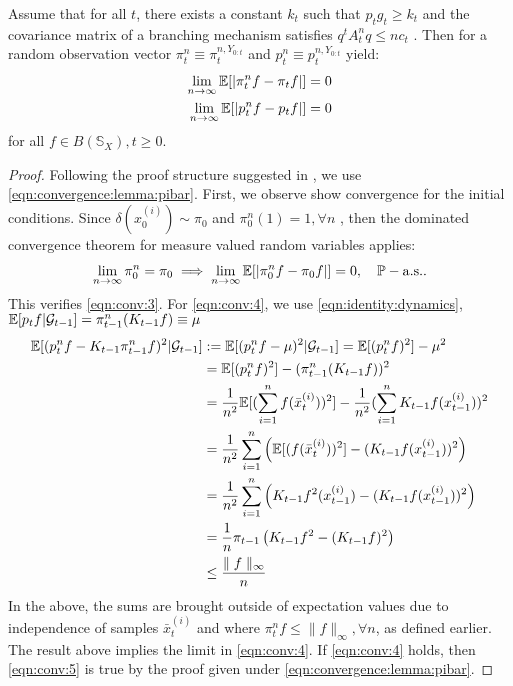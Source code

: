 \begin{theorem}  \label{bain:pfconvergence}
	Assume that for all $t$, there exists a constant $k_t$ such that $p_tg_t \geq k_t$ and the covariance matrix of a branching mechanism satisfies $q^t A_t^n q \leq n c_t$ . Then for a random observation vector $\pi_t^n \equiv \pi_t^{n, Y_{0:t}}$ and $p_t^n \equiv p_t^{n, Y_{0:t}}$ yield:
	\begin{align}
	\lim_{n\to \infty} \mathbb{E}[|\pi_t^n f - \pi_t f|] &= 0 \\
	\lim_{n\to \infty} \mathbb{E}[|p_t^n f - p_t f|] &= 0 
	\end{align}
	for all $f \in B(\mathbb{S}_X), t \geq 0$. 
	
	\begin{proof}
	Following the proof structure suggested in \cite{bain2009}, we use \cref{eqn:convergence:lemma:pibar}. First, we observe show convergence for the initial conditions. Since $\delta(x_0^{(i)}) \sim \pi_0$ and $\pi_0^n(1) = 1, \forall n$ , then the dominated convergence theorem  for measure valued random variables applies:
	\begin{align}
	\lim_{n \to \infty} \pi_0^n = \pi_0 \implies \lim_{n \to \infty} \mathbb{E}[|\pi_0^n f - \pi_0f|] = 0, \quad \mathbb{P}-\mathrm{a.s.}.
	\end{align} This verifies \cref{eqn:conv:3}.
	For \cref{eqn:conv:4}, we use \cref{eqn:identity:dynamics}, $\mathbb{E}[p_t f | \mathcal{G}_{t-1}] =  \pi_{t-1}^n (K_{t-1}f) \equiv \mu$
	\begin{align}
	\mathbb{E}[(p^n_tf - K_{t-1} \pi^n_{t-1}f)^2 | \mathcal{G}_{t-1}] &:= \mathbb{E}[(p^n_tf - \mu)^2 | \mathcal{G}_{t-1}] = \mathbb{E}[(p^n_tf)^2] - \mu^2  \\
	& = \mathbb{E}[(p^n_tf)^2] - (\pi_{t-1}^n (K_{t-1}f))^2 \\
	& = \frac{1}{n^2}\mathbb{E}[(\sum_{i=1}^n f(\bar{x}_t^{(i)}))^2] - \frac{1}{n^2}(\sum_{i=1}^n K_{t-1}f(x_{t-1}^{(i)}))^2 \\
	& = \frac{1}{n^2}\sum_{i=1}^n \left( \mathbb{E}[(f(\bar{x}_t^{(i)}))^2] - (K_{t-1}f(x_{t-1}^{(i)}))^2 \right) \\
	& = \frac{1}{n^2}\sum_{i=1}^n \left( K_{t-1} f^2(x_{t-1}^{(i)}) - (K_{t-1}f(x_{t-1}^{(i)}))^2 \right) \\
	& = \frac{1}{n}\pi_{t-1}\left( K_{t-1} f^2 - (K_{t-1}f)^2 \right) \\
	&\leq \frac{\parallel f \parallel_\infty}{n}
	\end{align} In the above, the sums are brought outside of expectation values due to independence of samples $\bar{x}_t^{(i)}$ and where $\pi^n_t f \leq \parallel f \parallel_\infty, \forall n$, as defined earlier. The result above implies the limit in  \cref{eqn:conv:4}. If  \cref{eqn:conv:4} holds, then  \cref{eqn:conv:5} is true by the proof given under \cref{eqn:convergence:lemma:pibar}. 
	\end{proof}
		
\end{theorem}

